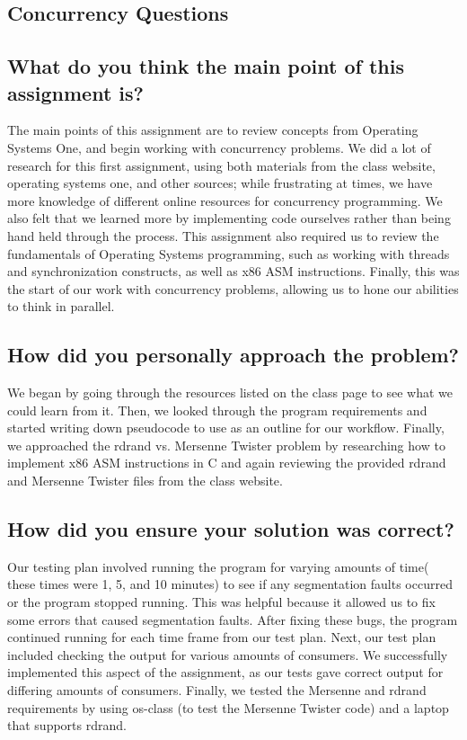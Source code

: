 \documentclass[letterpaper,10pt,draftclsnofoot,onecolumn]{IEEEtran}
\begin{document}
\begin{flushleft}
\section{Concurrency Questions}
\subsection{What do you think the main point of this assignment is?}
	The main points of this assignment are to review concepts from Operating Systems One, and begin working with concurrency problems. We did a lot of research for this first assignment, using both materials from the class website, operating systems one, and other sources; while frustrating at times, we have more knowledge of different online resources for concurrency programming. We also felt that we learned more by implementing code ourselves rather than being hand held through the process. This assignment also required us to review the fundamentals of Operating Systems programming, such as working with threads and synchronization constructs, as well as x86 ASM instructions. Finally, this was the start of our work with concurrency problems, allowing us to hone our abilities to think in parallel.

\subsection{How did you personally approach the problem?} 
	We began by going through the resources listed on the class page to see what we could learn from it. Then, we looked through the program requirements and started writing down pseudocode to use as an outline for our workflow. Finally, we approached the rdrand vs. Mersenne Twister problem by researching how to implement x86 ASM instructions in C and again reviewing the provided rdrand and Mersenne Twister files from the class website.

\subsection{ How did you ensure your solution was correct?} 
	Our testing plan involved running the program for varying amounts of time( these times were 1, 5, and 10 minutes) to see if any segmentation faults occurred or the program stopped running. This was helpful because it allowed us to fix some errors that caused segmentation faults. After fixing these bugs, the program continued running for each time frame from our test plan. Next, our test plan included checking the output for various amounts of consumers. We successfully implemented this aspect of the assignment, as our tests gave correct output for differing amounts of consumers. Finally, we tested the Mersenne and rdrand requirements by using os-class (to test the Mersenne Twister code) and a laptop that supports rdrand.


\end{flushleft}
\end{document}
